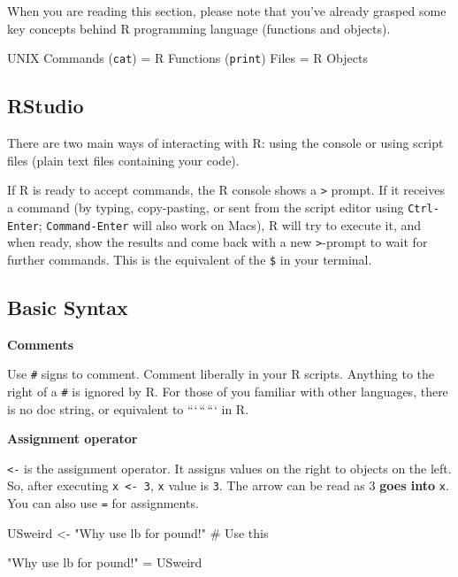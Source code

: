 \documentclass[
  letterpaper,
  DIV=11,
  numbers=noendperiod]{scrreprt}
\newenvironment{Shaded}{\begin{snugshade}}{\end{snugshade}}
\newcommand{\CommentTok}[1]{\textcolor[rgb]{0.37,0.37,0.37}{#1}}
\newcommand{\NormalTok}[1]{\textcolor[rgb]{0.00,0.23,0.31}{#1}}
\newcommand{\OtherTok}[1]{\textcolor[rgb]{0.00,0.23,0.31}{#1}}
\newcommand{\StringTok}[1]{\textcolor[rgb]{0.13,0.47,0.30}{#1}}
\begin{document}
When you are reading this section, please note that you've already
grasped some key concepts behind R programming language (functions and
objects).

UNIX Commands (\texttt{cat}) = R Functions (\texttt{print}) Files = R
Objects

\hypertarget{rstudio}{%
\subsection*{RStudio}\label{rstudio}}

There are two main ways of interacting with R: using the console or
using script files (plain text files containing your code).

If R is ready to accept commands, the R console shows a
\texttt{\textgreater{}} prompt. If it receives a command (by typing,
copy-pasting, or sent from the script editor using \texttt{Ctrl-Enter};
\texttt{Command-Enter} will also work on Macs), R will try to execute
it, and when ready, show the results and come back with a new
\texttt{\textgreater{}}-prompt to wait for further commands. This is the
equivalent of the \texttt{\$} in your terminal.

\hypertarget{basic-syntax}{%
\subsection*{Basic Syntax}\label{basic-syntax}}

\textbf{Comments}

Use \texttt{\#} signs to comment. Comment liberally in your R scripts.
Anything to the right of a \texttt{\#} is ignored by R. For those of you
familiar with other languages, there is no doc string, or equivalent to
```\,``\,``` in R.

\textbf{Assignment operator}

\texttt{\textless{}-} is the assignment operator. It assigns values on
the right to objects on the left. So, after executing
\texttt{x\ \textless{}-\ 3}, \texttt{x} value is \texttt{3}. The arrow
can be read as 3 \textbf{goes into} \texttt{x}. You can also use
\texttt{=} for assignments.

\begin{Shaded}
\begin{Highlighting}[]
\NormalTok{USweird }\OtherTok{\textless{}{-}} \StringTok{"Why use lb for pound!"} \CommentTok{\# Use this}

\StringTok{"Why use lb for pound!"} \OtherTok{=}\NormalTok{ USweird}
\end{Highlighting}
\end{Shaded}
\end{document}
